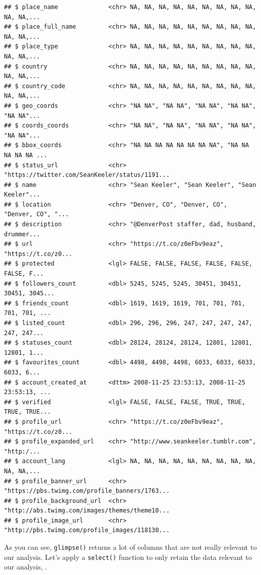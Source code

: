 \documentclass[
]{book}
\newenvironment{Shaded}{\begin{snugshade}}{\end{snugshade}}
\newcommand{\KeywordTok}[1]{\textcolor[rgb]{0.13,0.29,0.53}{\textbf{#1}}}
\newcommand{\NormalTok}[1]{#1}
\newcommand{\OperatorTok}[1]{\textcolor[rgb]{0.81,0.36,0.00}{\textbf{#1}}}
\newcommand{\StringTok}[1]{\textcolor[rgb]{0.31,0.60,0.02}{#1}}
\begin{document}
\begin{verbatim}
## $ place_name              <chr> NA, NA, NA, NA, NA, NA, NA, NA, NA, NA, NA,...
## $ place_full_name         <chr> NA, NA, NA, NA, NA, NA, NA, NA, NA, NA, NA,...
## $ place_type              <chr> NA, NA, NA, NA, NA, NA, NA, NA, NA, NA, NA,...
## $ country                 <chr> NA, NA, NA, NA, NA, NA, NA, NA, NA, NA, NA,...
## $ country_code            <chr> NA, NA, NA, NA, NA, NA, NA, NA, NA, NA, NA,...
## $ geo_coords              <chr> "NA NA", "NA NA", "NA NA", "NA NA", "NA NA"...
## $ coords_coords           <chr> "NA NA", "NA NA", "NA NA", "NA NA", "NA NA"...
## $ bbox_coords             <chr> "NA NA NA NA NA NA NA NA", "NA NA NA NA NA ...
## $ status_url              <chr> "https://twitter.com/SeanKeeler/status/1191...
## $ name                    <chr> "Sean Keeler", "Sean Keeler", "Sean Keeler"...
## $ location                <chr> "Denver, CO", "Denver, CO", "Denver, CO", "...
## $ description             <chr> "@DenverPost staffer, dad, husband, drummer...
## $ url                     <chr> "https://t.co/z0eFbv9eaz", "https://t.co/z0...
## $ protected               <lgl> FALSE, FALSE, FALSE, FALSE, FALSE, FALSE, F...
## $ followers_count         <dbl> 5245, 5245, 5245, 30451, 30451, 30451, 3045...
## $ friends_count           <dbl> 1619, 1619, 1619, 701, 701, 701, 701, 701, ...
## $ listed_count            <dbl> 296, 296, 296, 247, 247, 247, 247, 247, 247...
## $ statuses_count          <dbl> 28124, 28124, 28124, 12801, 12801, 12801, 1...
## $ favourites_count        <dbl> 4498, 4498, 4498, 6033, 6033, 6033, 6033, 6...
## $ account_created_at      <dttm> 2008-11-25 23:53:13, 2008-11-25 23:53:13, ...
## $ verified                <lgl> FALSE, FALSE, FALSE, TRUE, TRUE, TRUE, TRUE...
## $ profile_url             <chr> "https://t.co/z0eFbv9eaz", "https://t.co/z0...
## $ profile_expanded_url    <chr> "http://www.seankeeler.tumblr.com", "http:/...
## $ account_lang            <lgl> NA, NA, NA, NA, NA, NA, NA, NA, NA, NA, NA,...
## $ profile_banner_url      <chr> "https://pbs.twimg.com/profile_banners/1763...
## $ profile_background_url  <chr> "http://abs.twimg.com/images/themes/theme10...
## $ profile_image_url       <chr> "http://pbs.twimg.com/profile_images/118130...
\end{verbatim}

As you can see, \texttt{glimpse()} returns a lot of columns that are not really relevant to our analysis. Let's apply a \texttt{select()} function to only retain the data relevant to our analysis, .

\begin{Shaded}
\end{Shaded}
\end{document}
